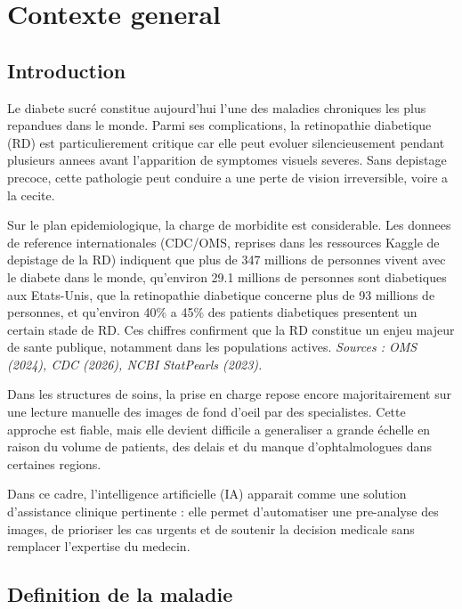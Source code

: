 
\chapter{Contexte general}
\label{chap:contexte_general}

\section{Introduction}
Le diabete sucré constitue aujourd'hui l'une des maladies chroniques les plus repandues dans le monde.
Parmi ses complications, la retinopathie diabetique (RD) est particulierement critique car elle peut evoluer
silencieusement pendant plusieurs annees avant l'apparition de symptomes visuels severes.
Sans depistage precoce, cette pathologie peut conduire a une perte de vision irreversible, voire a la cecite.

Sur le plan epidemiologique, la charge de morbidite est considerable. Les donnees de reference
internationales (CDC/OMS, reprises dans les ressources Kaggle de depistage de la RD) indiquent
que plus de 347 millions de personnes vivent avec le diabete dans le monde,
qu'environ 29.1 millions de personnes sont diabetiques aux Etats-Unis,
que la retinopathie diabetique concerne plus de 93 millions de personnes,
et qu'environ 40\% a 45\% des patients diabetiques presentent un certain stade de RD.
Ces chiffres confirment que la RD constitue un enjeu majeur de sante publique,
notamment dans les populations actives.
\textit{Sources : OMS (2024), CDC (2026), NCBI StatPearls (2023).}

Dans les structures de soins, la prise en charge repose encore majoritairement sur une lecture manuelle des images
de fond d'oeil par des specialistes. Cette approche est fiable, mais elle devient difficile a generaliser a grande
échelle en raison du volume de patients, des delais et du manque d'ophtalmologues dans certaines regions.

Dans ce cadre, l'intelligence artificielle (IA) apparait comme une solution d'assistance clinique pertinente :
elle permet d'automatiser une pre-analyse des images, de prioriser les cas urgents et de soutenir la decision
medicale sans remplacer l'expertise du medecin.

\section{Definition de la maladie}
